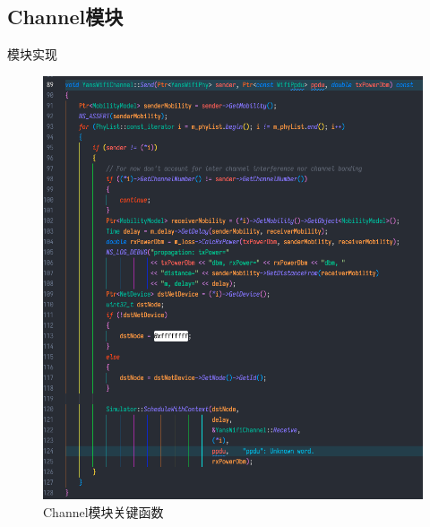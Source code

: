 \documentclass{beamer}
\begin{document}
\subsection{Channel模块}
\begin{frame}{模块实现}
	\begin{figure}[h]
		\centering
		\includegraphics[height=0.8\textheight]{pic/channel.png}
		\caption{Channel模块关键函数}
	\end{figure}
\end{frame}
\end{document}
